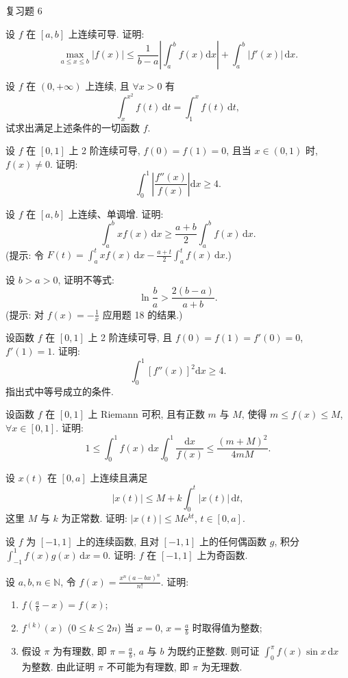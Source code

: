\begin{exblock}{复习题 6}
\item 设 $f$ 在 $[a,b]$ 上连续可导. 证明:
\[
\max_{a\leqslant x\leqslant b}|f(x)|\leqslant\frac{1}{b-a}\left|\int_{a}^{b}f(x)\mathrm{d}x\right|+\int_{a}^{b}|f'(x)|\,\mathrm{d}x.
\]

\item 设 $f$ 在 $(0,+\infty)$ 上连续, 且 $\forall x>0$ 有
\[
\int_{x}^{x^{2}}f(t)\,\mathrm{d}t=\int_{1}^{x}f(t)\,\mathrm{d}t,
\]
试求出满足上述条件的一切函数 $f$.

\item 设 $f$ 在 $[0,1]$ 上 2 阶连续可导, $f(0)=f(1)=0$, 且当 $x\in(0,1)$ 时, $f(x)\neq 0$. 证明:
\[
\int_{0}^{1}\left|\frac{f''(x)}{f(x)}\right|\mathrm{d}x\geqslant 4.
\]

\item 设 $f$ 在 $[a,b]$ 上连续、单调增. 证明:
\[
\int_{a}^{b}xf(x)\,\mathrm{d}x\geqslant\frac{a+b}{2}\int_{a}^{b}f(x)\,\mathrm{d}x.
\]
(提示: 令 $F(t)=\int_{a}^{t}xf(x)\,\mathrm{d}x-\frac{a+t}{2}\int_{a}^{t}f(x)\,\mathrm{d}x$.)

\item 设 $b>a>0$, 证明不等式:
\[
\ln\frac{b}{a}>\frac{2(b-a)}{a+b}.
\]
(提示: 对 $f(x)=-\frac{1}{x}$ 应用题 18 的结果.)

\item 设函数 $f$ 在 $[0,1]$ 上 2 阶连续可导, 且 $f(0)=f(1)=f'(0)=0$, $f'(1)=1$. 证明:
\[
\int_{0}^{1}\left[f''(x)\right]^{2}\mathrm{d}x\geqslant 4.
\]
指出式中等号成立的条件.

\item 设函数 $f$ 在 $[0,1]$ 上 Riemann 可积, 且有正数 $m$ 与 $M$, 使得 $m\leqslant f(x)\leqslant M$, $\forall x\in[0,1]$. 证明:
\[
1\leqslant\int_{0}^{1}f(x)\,\mathrm{d}x\int_{0}^{1}\frac{\mathrm{d}x}{f(x)}\leqslant\frac{(m+M)^{2}}{4mM}.
\]

\item 设 $x(t)$ 在 $[0,a]$ 上连续且满足
\[
|x(t)|\leqslant M+k\int_{0}^{t}|x(t)|\,\mathrm{d}t,
\]
这里 $M$ 与 $k$ 为正常数. 证明: $|x(t)|\leqslant M\mathrm{e}^{kt}$, $t\in[0,a]$.

\item 设 $f$ 为 $[-1,1]$ 上的连续函数, 且对 $[-1,1]$ 上的任何偶函数 $g$, 积分 $\int_{-1}^{1}f(x)g(x)\,\mathrm{d}x=0$. 证明: $f$ 在 $[-1,1]$ 上为奇函数.

\item 设 $a,b,n\in\mathbb{N}$, 令 $f(x)=\frac{x^{n}(a-bx)^{n}}{n!}$. 证明:
\begin{enumerate}[label=(\arabic*)]
  \item $f\left(\frac{a}{b}-x\right)=f(x)$;
  \item $f^{(k)}(x)$ ($0\leqslant k\leqslant 2n$) 当 $x=0$, $x=\frac{a}{b}$ 时取得值为整数;
  \item 假设 $\pi$ 为有理数, 即 $\pi=\frac{a}{b}$, $a$ 与 $b$ 为既约正整数. 则可证 $\int_{0}^{\pi}f(x)\sin x\,\mathrm{d}x$ 为整数. 由此证明 $\pi$ 不可能为有理数, 即 $\pi$ 为无理数.
\end{enumerate}


\end{exblock}
